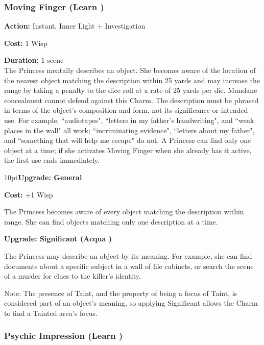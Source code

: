 \subsubsection*{Moving Finger (Learn \textbullet\textbullet\textbullet)}

\noindent \textbf{Action:} Instant, Inner Light + Investigation

\noindent \textbf{Cost:} 1 Wisp

\noindent \textbf{Duration:} 1 scene \\

\noindent The Princess mentally describes an object. She becomes aware of the location of the nearest object matching the description within 25 yards and may increase the range by taking a penalty to the dice roll at a rate of 25 yards per die. Mundane concealment cannot defend against this Charm. The description must be phrased in terms of the object's composition and form, not its significance or intended use. For example, \textquotedblleft audiotapes", \textquotedblleft letters in my father's handwriting", and \textquotedblleft weak places in the wall" all work; \textquotedblleft incriminating evidence", \textquotedblleft letters about my father", and \textquotedblleft something that will help me escape" do not. A Princess can find only one object at a time; if she activates Moving Finger when she already has it active, the first use ends immediately.

\begin{myindentpar}{10pt}\textbf{Upgrade: General}

\noindent \textbf{Cost:} +1 Wisp

The Princess becomes aware of every object matching the description within range. She can find objects matching only one description at a time.

\textbf{Upgrade: Significant (Acqua \textbullet\textbullet)}

The Princess may describe an object by its meaning. For example, she can find documents about a specific subject in a wall of file cabinets, or search the scene of a murder for clues to the killer's identity.

Note: The presence of Taint, and the property of being a focus of Taint, is considered part of an object's meaning, so applying Significant allows the Charm to find a Tainted area's focus.\end{myindentpar}


\subsubsection*{Psychic Impression (Learn \textbullet\textbullet\textbullet)}

